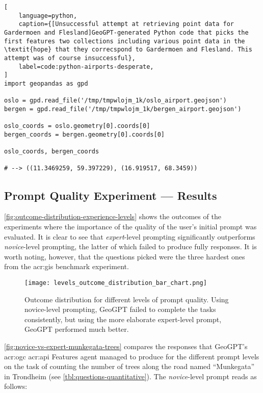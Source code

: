 \FloatBarrier

\begin{lstlisting}[
    language=python,
    caption={[Unsuccessful attempt at retrieving point data for Gardermoen and Flesland]GeoGPT-generated Python code that picks the first features two collections including various point data in the \textit{hope} that they correcspond to Gardermoen and Flesland. This attempt was of course insuccessful},
    label=code:python-airports-desperate,
]
import geopandas as gpd

oslo = gpd.read_file('/tmp/tmpwlojm_1k/oslo_airport.geojson')
bergen = gpd.read_file('/tmp/tmpwlojm_1k/bergen_airport.geojson')

oslo_coords = oslo.geometry[0].coords[0]
bergen_coords = bergen.geometry[0].coords[0]

oslo_coords, bergen_coords   

# --> ((11.3469259, 59.397229), (16.919517, 68.3459))
\end{lstlisting}


\newpage

\subsection{Prompt Quality Experiment --- Results}
\label{subsec:prompt-quality-test-results}

\autoref{fig:outcome-distribution-experience-levels} shows the outcomes of the experiments where the importance of the quality of the user's initial prompt was evaluated. It is clear to see that \textit{expert}-level prompting significantly outperforms \textit{novice}-level prompting, the latter of which failed to produce fully responses. It is worth noting, however, that the questions picked were the three hardest ones from the \acrshort{acr:gis} benchmark experiment.

\begin{figure}[htbp]
    \centering
    \texttt{[image: levels\_outcome\_distribution\_bar\_chart.png]}
    \caption[Outcome distribution for different levels of prompt quality]{Outcome distribution for different levels of prompt quality. Using novice-level prompting, GeoGPT failed to complete the tasks consistently, but using the more elaborate expert-level prompt, GeoGPT performed much better.}
    \label{fig:outcome-distribution-experience-levels}
\end{figure}

\autoref{fig:novice-vs-expert-munkegata-trees} compares the responses that GeoGPT's \acrshort{acr:ogc} \acrshort{acr:api} Features agent managed to produce for the different prompt levels on the task of counting the number of trees along the road named \enquote{Munkegata} in Trondheim (see \autoref{tbl:questions-quantitative}). The \textit{novice}-level prompt reads as follows:


